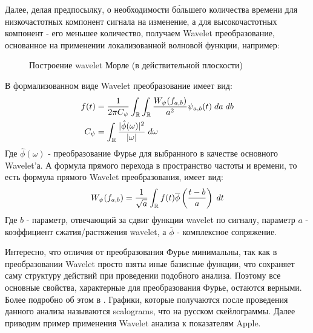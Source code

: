 Далее, делая предпосылку, о необходимости б\'{о}льшего количества времени для низкочастотных компонент сигнала на изменение, а для высокочастотных компонент - его меньшее количество, получаем Wavelet преобразование, основанное на применении локализованной волновой функции, например:
\begin{figure}[H]
	\centering
	\caption{Построение wavelet Морле (в действительной плоскости)}
\end{figure}
В формализованном виде Wavelet преобразование имеет вид:
\begin{equation}
	\begin{split}
		f(t) & = \frac{1}{2\pi C_{\psi}} \int_{\mathbb{R}} \int_{\mathbb{R}} \frac{W_{\psi}(f_{a, b})}{a^2}\psi_{a, b}(t) \; da \; db\\
		C_{\psi} & = \int_{\mathbb{R}} \frac{|\hat{\phi}(\omega)|^2}{|\omega|} \; d \omega
	\end{split}
\end{equation}
Где $\hat{\phi}(\omega)$ - преобразование Фурье для выбранного в качестве основного Wavelet'а. А формула прямого перехода в пространство частоты и времени, то есть формула прямого Wavelet преобразования, имеет вид:
\begin{equation}
	W_{\psi}(f_{a, b}) = \frac{1}{\sqrt{a}}\int_{\mathbb{R}}f(t) \overline{\phi}\left( \frac{t - b}{a} \right) \; dt
\end{equation}
Где $b$ - параметр, отвечающий за сдвиг функции wavelet по сигналу, параметр $a$ - коэффициент сжатия/растяжения wavelet, а $\overline{\phi}$ - комплексное сопряжение.

Интересно, что отличия от преобразования Фурье минимальны, так как в преобразовании Wavelet просто взяты иные базисные функции, что сохраняет саму структуру действий при проведении подобного анализа. Поэтому все основные свойства, характерные для преобразования Фурье, остаются верными. Более подробно об этом в \cite{brunton2022data}. Графики, которые получаются после проведения данного анализа называются scalograms, что на русском скейлограммы. Далее приводим пример применения Wavelet анализа к показателям Apple.

